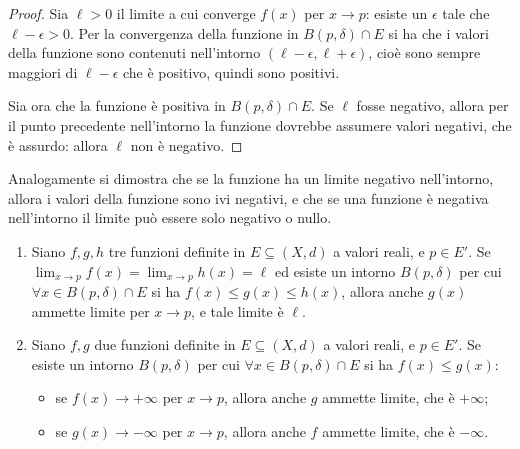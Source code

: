 \begin{proof}
Sia $\ell>0$ il limite a cui converge $f(x)$ per $x\to p$: esiste un $\epsilon$ tale che $\ell-\epsilon>0$. Per la convergenza della funzione in $B(p,\delta)\cap E$ si ha che i valori della funzione sono contenuti nell'intorno $(\ell-\epsilon,\ell+\epsilon)$, cioè sono sempre maggiori di $\ell-\epsilon$ che è positivo, quindi sono positivi.

Sia ora che la funzione è positiva in $B(p,\delta)\cap E$. Se $\ell$ fosse negativo, allora per il punto precedente nell'intorno la funzione dovrebbe assumere valori negativi, che è assurdo: allora $\ell$ non è negativo.
\end{proof}
Analogamente si dimostra che se la funzione ha un limite negativo nell'intorno, allora i valori della funzione sono ivi negativi, e che se una funzione è negativa nell'intorno il limite può essere solo negativo o nullo.
\begin{teorema}
\begin{enumerate}
\item Siano $f,g,h$ tre funzioni definite in $E\subseteq(X,d)$ a valori reali, e $p\in E'$. Se $\lim_{x\to p}f(x)=\lim_{x\to p}h(x)=\ell$ ed esiste un intorno $B(p,\delta)$ per cui $\forall x\in B(p,\delta)\cap E$ si ha $f(x)\leq g(x)\leq h(x)$, allora anche $g(x)$ ammette limite per $x\to p$, e tale limite è $\ell$.
\item Siano $f,g$ due funzioni definite in $E\subseteq(X,d)$ a valori reali, e $p\in E'$. Se esiste un intorno $B(p,\delta)$ per cui $\forall x\in B(p,\delta)\cap E$ si ha $f(x)\leq g(x)$:
\begin{itemize}
\item se $f(x)\to+\infty$ per $x\to p$, allora anche $g$ ammette limite, che è $+\infty$;
\item se $g(x)\to-\infty$ per $x\to p$, allora anche $f$ ammette limite, che è $-\infty$. 
\end{itemize}
\end{enumerate}
\end{teorema}
